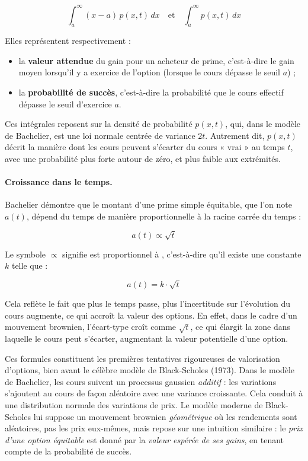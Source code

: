 \documentclass[12pt,a4paper]{article}
\begin{document}
\[
\int_a^{\infty} (x - a)\, p(x,t)\, dx
\quad \text{et} \quad
\int_a^{\infty} p(x,t)\, dx
\]

Elles représentent respectivement :
\begin{itemize}
    \item la \textbf{valeur attendue} du gain pour un acheteur de prime, c’est-à-dire le gain moyen lorsqu’il y a exercice de l’option (lorsque le cours dépasse le seuil \( a \)) ;
    \item la \textbf{probabilité de succès}, c’est-à-dire la probabilité que le cours effectif dépasse le seuil d’exercice \( a \).
\end{itemize}

Ces intégrales reposent sur la densité de probabilité \( p(x,t) \), qui, dans le modèle de Bachelier, est une loi normale centrée de variance \( 2t \). Autrement dit, \( p(x,t) \) décrit la manière dont les cours peuvent s’écarter du cours « vrai » au temps \( t \), avec une probabilité plus forte autour de zéro, et plus faible aux extrémités.

\paragraph{Croissance dans le temps.}

Bachelier démontre que le montant d’une prime simple équitable, que l’on note \( a(t) \), dépend du temps de manière proportionnelle à la racine carrée du temps :

\[
a(t) \propto \sqrt{t}
\]

Le symbole \( \propto \) signifie \og est proportionnel à \fg, c’est-à-dire qu’il existe une constante \( k \) telle que :

\[
a(t) = k \cdot \sqrt{t}
\]

Cela reflète le fait que plus le temps passe, plus l’incertitude sur l’évolution du cours augmente, ce qui accroît la valeur des options. En effet, dans le cadre d’un mouvement brownien, l’écart-type croît comme \( \sqrt{t} \), ce qui élargit la zone dans laquelle le cours peut s’écarter, augmentant la valeur potentielle d’une option.

\bigskip

Ces formules constituent les premières tentatives rigoureuses de valorisation d'options, bien avant le célèbre modèle de Black-Scholes (1973). Dans le modèle de Bachelier, les cours suivent un processus gaussien \textit{additif} : les variations s'ajoutent au cours de façon aléatoire avec une variance croissante. Cela conduit à une distribution normale des variations de prix.
Le modèle moderne de Black-Scholes lui suppose un mouvement brownien \textit{géométrique} où les rendements sont aléatoires, pas les prix eux-mêmes, mais repose sur une intuition similaire : le \textit{prix d'une option équitable} est donné par la \textit{valeur espérée de ses gains}, en tenant compte de la probabilité de succès.
\end{document}
